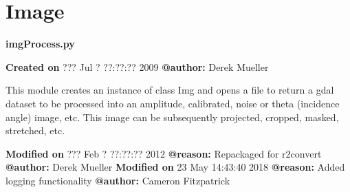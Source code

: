 \documentclass[letterpaper,10pt,openany,oneside]{sphinxmanual}
\begin{document}
\section{Image}
\label{code:module-Image}\label{code:image}
\textbf{imgProcess.py}

\textbf{Created on} ??? Jul  ? ??:??:?? 2009 \textbf{@author:} Derek Mueller

This module creates an instance of class Img and opens a file to return a
gdal dataset to be processed into an amplitude, calibrated, noise or theta
(incidence angle) image, etc. This image can be subsequently projected,
cropped, masked, stretched, etc.

\textbf{Modified on} ??? Feb  ? ??:??:?? 2012 \textbf{@reason:} Repackaged for r2convert \textbf{@author:} Derek Mueller
\textbf{Modified on} 23 May 14:43:40 2018 \textbf{@reason:} Added logging functionality \textbf{@author:} Cameron Fitzpatrick
\end{document}
